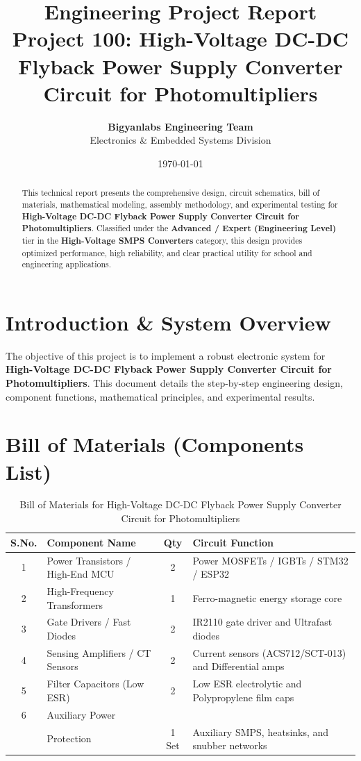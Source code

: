 \documentclass[11pt,a4paper]{article}
\title{\textbf{\Huge Engineering Project Report}\\[0.5em] \Large Project 100: High-Voltage DC-DC Flyback Power Supply Converter Circuit for Photomultipliers}
\author{\textbf{Bigyanlabs Engineering Team}\\ Electronics \& Embedded Systems Division}
\date{\today}
\begin{document}
\maketitle
\thispagestyle{empty}

\begin{abstract}
This technical report presents the comprehensive design, circuit schematics, bill of materials, mathematical modeling, assembly methodology, and experimental testing for \textbf{High-Voltage DC-DC Flyback Power Supply Converter Circuit for Photomultipliers}. Classified under the \textbf{Advanced / Expert (Engineering Level)} tier in the \textbf{High-Voltage SMPS Converters} category, this design provides optimized performance, high reliability, and clear practical utility for school and engineering applications.
\end{abstract}

\newpage
\tableofcontents
\newpage

\section{Introduction \& System Overview}
The objective of this project is to implement a robust electronic system for \textbf{High-Voltage DC-DC Flyback Power Supply Converter Circuit for Photomultipliers}. This document details the step-by-step engineering design, component functions, mathematical principles, and experimental results.

\section{Bill of Materials (Components List)}
\begin{table}[h!]
\centering
\caption{Bill of Materials for High-Voltage DC-DC Flyback Power Supply Converter Circuit for Photomultipliers}
\vspace{0.5em}
\begin{tabular}{clcp{7cm}}
\toprule
\textbf{S.No.} & \textbf{Component Name} & \textbf{Qty} & \textbf{Circuit Function} \\
\midrule
1 & Power Transistors / High-End MCU & 2 & Power MOSFETs / IGBTs / STM32 / ESP32 \\
2 & High-Frequency Transformers & 1 & Ferro-magnetic energy storage core \\
3 & Gate Drivers / Fast Diodes & 2 & IR2110 gate driver and Ultrafast diodes \\
4 & Sensing Amplifiers / CT Sensors & 2 & Current sensors (ACS712/SCT-013) and Differential amps \\
5 & Filter Capacitors (Low ESR) & 2 & Low ESR electrolytic and Polypropylene film caps \\
6 & Auxiliary Power \\& Protection & 1 Set & Auxiliary SMPS, heatsinks, and snubber networks \\
\bottomrule
\end{tabular}
\end{table}
\end{document}
